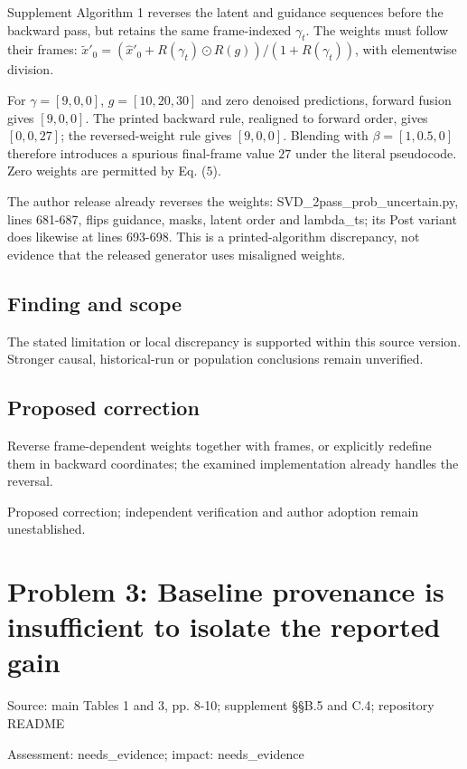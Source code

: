 \documentclass[11pt]{article}
\begin{document}
Supplement Algorithm 1 reverses the latent and guidance sequences before the backward pass, but retains the same frame-indexed \(\gamma_t\). The weights must follow their frames: \(\widetilde x'_0=(\widehat x'_0+R(\gamma_t)\odot R(g))/(1+R(\gamma_t))\), with elementwise division.

For \(\gamma=[9,0,0]\), \(g=[10,20,30]\) and zero denoised predictions, forward fusion gives \([9,0,0]\). The printed backward rule, realigned to forward order, gives \([0,0,27]\); the reversed-weight rule gives \([9,0,0]\). Blending with \(\beta=[1,0.5,0]\) therefore introduces a spurious final-frame value \(27\) under the literal pseudocode. Zero weights are permitted by Eq. (\(5\)).

The author release already reverses the weights: SVD\_2pass\_prob\_uncertain.py, lines 681-687, flips guidance, masks, latent order and lambda\_ts; its Post variant does likewise at lines 693-698. This is a printed-algorithm discrepancy, not evidence that the released generator uses misaligned weights.

\subsection*{Finding and scope}

The stated limitation or local discrepancy is supported within this source version. Stronger causal, historical-run or population conclusions remain unverified.

\subsection*{Proposed correction}

Reverse frame-dependent weights together with frames, or explicitly redefine them in backward coordinates; the examined implementation already handles the reversal.

Proposed correction; independent verification and author adoption remain unestablished.

\section*{Problem 3: Baseline provenance is insufficient to isolate the reported gain}

Source: main Tables 1 and 3, pp. 8-10; supplement §§B.5 and C.4; repository README

Assessment: needs\_evidence; impact: needs\_evidence
\end{document}
